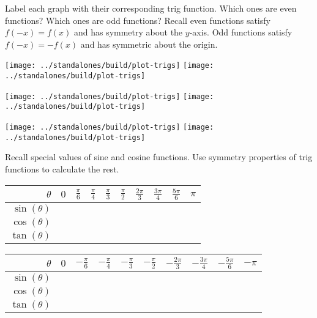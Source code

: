 \documentclass[../main.tex]{subfiles}
\begin{document}
  \begin{example}
    Label each graph with their corresponding trig function. Which ones are even functions? Which ones are odd functions?  \newline
    {\footnotesize Recall even functions satisfy \(f(-x) = f(x)\) and has symmetry about the \(y\)-axis. Odd functions satisfy \(f(-x) = -f(x)\) and has symmetric about the origin.}

    \begin{center}
      \texttt{[image: ../standalones/build/plot-trigs]}
      \hspace{0.5in}
      \texttt{[image: ../standalones/build/plot-trigs]}
    \end{center}
    \vfill{}

    \begin{center}
      \texttt{[image: ../standalones/build/plot-trigs]}
      \hspace{0.5in}
      \texttt{[image: ../standalones/build/plot-trigs]}
    \end{center}
    \vfill{}

    \begin{center}
      \texttt{[image: ../standalones/build/plot-trigs]}
      \hspace{0.5in}
      \texttt{[image: ../standalones/build/plot-trigs]}
    \end{center}
    \vfill{}
  \end{example}

  \begin{example}
    Recall special values of sine and cosine functions. Use symmetry properties of trig functions to calculate the rest.

    \begin{tabular}{r|p{1cm}|p{1cm}|p{1cm}|p{1cm}|p{1cm}|p{1cm}|p{1cm}|p{1cm}|p{1cm}}
      \(\theta\) & \(0\) & \(\frac{\pi}{6}\) & \(\frac{\pi}{4}\) & \(\frac{\pi}{3}\) & \(\frac{\pi}{2}\) & \(\frac{2\pi}{3}\) & \(\frac{3\pi}{4}\) & \(\frac{5\pi}{6}\) & \(\pi\) \\\midrule
      \(\sin(\theta)\) &&&&&&&&&\\[3ex]\midrule
      \(\cos(\theta)\) &&&&&&&&&\\[3ex]\midrule
      \(\tan(\theta)\) &&&&&&&&&\\[3ex]
    \end{tabular}

    \begin{tabular}{r|p{1cm}|p{1cm}|p{1cm}|p{1cm}|p{1cm}|p{1cm}|p{1cm}|p{1cm}|p{1cm}}
      \(\theta\) & \(0\) & \(-\frac{\pi}{6}\) & \(-\frac{\pi}{4}\) & \(-\frac{\pi}{3}\) & \(-\frac{\pi}{2}\) & \(-\frac{2\pi}{3}\) & \(-\frac{3\pi}{4}\) & \(-\frac{5\pi}{6}\) & \(-\pi\) \\\midrule
      \(\sin(\theta)\) &&&&&&&&&\\[3ex]\midrule
      \(\cos(\theta)\) &&&&&&&&&\\[3ex]\midrule
      \(\tan(\theta)\) &&&&&&&&&\\[3ex]
    \end{tabular}
  \end{example}
  \vfill{}

  \clearpage
\end{document}
